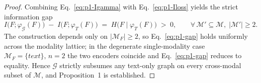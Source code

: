 \documentclass{article}
\begin{document}
\begin{proof}
Combining Eq.~\eqref{eq:p1-Igamma} with Eq.~\eqref{eq:p1-Iloss} yields the strict information gap
\begin{equation}
I\!\bigl(F;\varphi_{\mathcal{G}}(F)\bigr)\;-\;I\!\bigl(F;\varphi_T(F)\bigr)\;=\;H\!\bigl(F\!\mid\!\varphi_T(F)\bigr)\;>\;0,\qquad \forall\,\mathcal{M}'\!\subseteq\!\mathcal{M},\;|\mathcal{M}'|\!\geq\!2.
\label{eq:p1-gap}
\end{equation}
The construction depends only on $|\mathcal{M}_F|\!\geq\!2$, so Eq.~\eqref{eq:p1-gap} holds uniformly across the modality lattice; in the degenerate single-modality case $\mathcal{M}_F\!=\!\{\textit{text}\},\,n\!=\!2$ the two encoders coincide and Eq.~\eqref{eq:p1-gap} reduces to equality. Hence $\mathcal{G}$ strictly subsumes any text-only graph on every cross-modal subset of $\mathcal{M}$, and Proposition~1 is established.
\end{proof}
\end{document}
